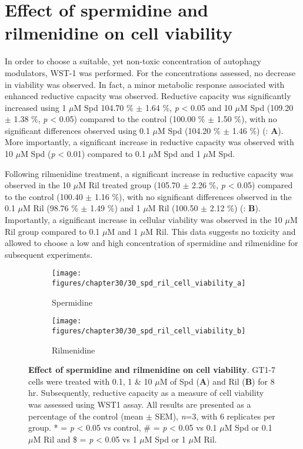 {\section{Effect of spermidine and rilmenidine on cell viability}
In order to choose a suitable, yet non-toxic concentration of autophagy modulators, WST-1 was performed. For the concentrations assessed, no decrease in viability was observed. In fact, a minor metabolic response associated with enhanced reductive capacity was observed. Reductive capacity was significantly increased using 1 $\mu$M Spd 104.70 \% $\pm$ 1.64 \%, \textit{p} < 0.05 and 10 $\mu$M Spd (109.20 $\pm$ 1.38 \%, \textit{p} < 0.05) compared to the control (100.00 \% $\pm$ 1.50 \%), with no significant differences observed using 0.1 $\mu$M Spd (104.20 \% $\pm$ 1.46 \%) (: \textbf{A}). More importantly, a significant increase in reductive capacity was observed with 10 $\mu$M Spd (\textit{p} < 0.01) compared to 0.1 $\mu$M Spd and 1 $\mu$M Spd.

Following rilmenidine treatment, a significant increase in reductive capacity was observed in the 10 $\mu$M Ril treated group (105.70 $\pm$ 2.26 \%, \textit{p} < 0.05) compared to the control (100.40 $\pm$ 1.16 \%), with no significant differences observed in the 0.1 $\mu$M Ril (98.76 \% $\pm$ 1.49 \%) and 1 $\mu$M Ril (100.50 $\pm$ 2.12 \%) (: \textbf{B}). Importantly, a significant increase in cellular viability was observed in the 10 $\mu$M Ril group compared to 0.1 $\mu$M and 1 $\mu$M Ril. This data suggests no toxicity and allowed to choose a low and high concentration of spermidine and rilmenidine for subsequent experiments.

\begin{figure}[!htbp]
  \centering
  \begin{subfigure}[b]{0.495\linewidth}
    \texttt{[image: figures/chapter30/30\_spd\_ril\_cell\_viability\_a]}
    \caption{Spermidine}
  \end{subfigure}
  \begin{subfigure}[b]{0.495\linewidth}
    \texttt{[image: figures/chapter30/30\_spd\_ril\_cell\_viability\_b]}
    \caption{Rilmenidine}
  \end{subfigure}
  \caption[Effect of spermidine and rilmenidine on cell viability]{\textbf{Effect of spermidine and rilmenidine on cell viability}. GT1-7 cells were treated with 0.1, 1 \& 10 $\mu$M of Spd (\textbf{A}) and Ril (\textbf{B}) for 8 hr. Subsequently, reductive capacity as a measure of cell viability was assessed using WST1 assay. All results are presented as a percentage of the control (mean $\pm$ SEM), \textit{n}=3, with 6 replicates per group. * = \textit{p} < 0.05 vs control, \# = \textit{p} < 0.05 vs 0.1 $\mu$M Spd or 0.1 $\mu$M Ril and \$ = \textit{p} < 0.05 vs 1 $\mu$M Spd or 1 $\mu$M Ril.}
  \label{fig:30_spd_ril_cell_viability_a}
\end{figure}

}
